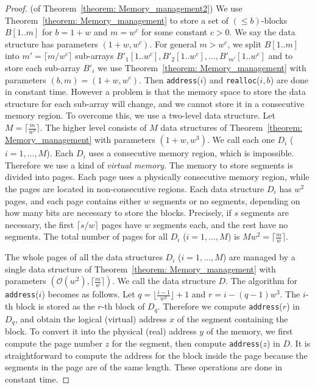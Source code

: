 \documentclass{llncs}
\newcommand{\Order}{\mathcal{O}}
\begin{document}
\begin{proof}  (of Theorem~\ref{theorem: Memory_management2})
We use Theorem~\ref{theorem: Memory_management} to store a set of $(\leq b)$-blocks
$B[1..m]$ for $b = 1+w$ and $m = w^c$ for some constant $c>0$.
We say the data structure has parameters $(1+w, w^c)$.
For general $m > w^c$, we split $B[1..m]$ into $m' = \lceil m/w^c \rceil$ sub-arrays
$B'_1[1..w^c], B'_2[1..w^c], \ldots, B'_{m'}[1..w^c]$ and to store each sub-array $B'_i$
we use Theorem~\ref{theorem: Memory_management} with parameters $(b,m) = (1+w, w^c)$.
Then \texttt{address}($i$) and \texttt{realloc}($i,b$) are done in constant time.
However a problem is that the memory space to store the data structure 
for each sub-array will change, and we cannot store it in a consecutive memory region.
To overcome this, we use a two-level data structure.
Let $M = \lceil \frac{m}{w^3} \rceil$.
The higher level consists of $M$ data structures of 
Theorem~\ref{theorem: Memory_management} with parameters $(1+w, w^3)$.
We call each one $D_i$ 
($i = 1,\ldots,M$).  Each $D_i$ uses a consecutive
memory region, which is impossible.  Therefore we use a kind of \emph{virtual memory}.
The memory to store segments is divided into pages.
Each page uses a physically consecutive memory region, while the pages are
located in non-consecutive regions.
Each data structure $D_i$ has $w^2$ pages, and each page contains either $w$ segments
or no segments, depending on how many bits are necessary to store the blocks.
Precisely, if $s$ segments are necessary, the first $\lceil s/w \rceil$ pages
have $w$ segments each, and the rest have no segments.
The total number of pages for all $D_i$ ($i = 1,\ldots,M$) is 
$M w^2 = \lceil \frac{m}{w} \rceil$.

The whole pages of all the data structures $D_i$ ($i = 1,\ldots,M$)
are managed by a single data structure of Theorem~\ref{theorem: Memory_management}
with parameters $(\Order(w^2), \lceil \frac{m}{w} \rceil)$.
We call the data structure $D$.  
The algorithm for \texttt{address}($i$) becomes as follows.
Let $q = \lfloor \frac{i-1}{w^3} \rfloor + 1$ and $r = i - (q-1)w^3$.
The $i$-th block is stored as the $r$-th block of $D_q$.
Therefore we compute \texttt{address}($r$) in $D_q$, and obtain the logical (virtual)
address $x$ of the segment containing the block.
To convert it into the physical (real) address $y$ of the memory,
we first compute the page number $z$ for the segment, then compute
\texttt{address}($z$) in $D$.  It is straightforward to compute the address
for the block inside the page because the segments in the page are of
the same length.
These operations are done in constant time.


\end{proof}
\end{document}
